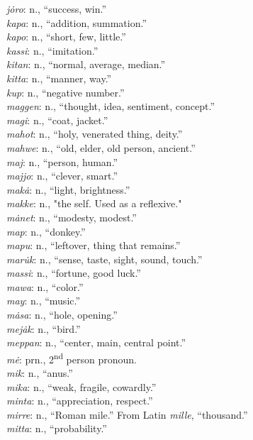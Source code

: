 \documentclass{article}[10pt]
\begin{document}
\begin{multicols}{3}
\emph{j\.{o}ro}: n., ``success, win.''\\
\emph{kapa}: n., ``addition, summation.''\\
\emph{kapo}: n., ``short, few, little.''\\
\emph{kassi}: n., ``imitation.''\\
\emph{kitan}: n., ``normal, average, median.''\\
\emph{kitta}: n., ``manner, way.''\\
\emph{kup}: n., ``negative number.''\\
\emph{maggen}: n., ``thought, idea, sentiment, concept.''\\
\emph{magi}: n., ``coat, jacket.''\\
\emph{mahot}: n., ``holy, venerated thing, deity.''\\
\emph{mahwe}: n., ``old, elder, old person, ancient.''\\
\emph{maj}: n., ``person, human.''\\
\emph{majjo}: n., ``clever, smart.''\\
\emph{mak\.{a}}: n., ``light, brightness.''\\
\emph{makke}: n., "the self. Used as a reflexive."\\
\emph{m\.{a}net}: n., ``modesty, modest.''\\
\emph{map}: n., ``donkey.''\\
\emph{mapu}: n., ``leftover, thing that remains.''\\
\emph{mar\.{u}k}: n., ``sense, taste, sight, sound, touch.''\\
\emph{massi}: n., ``fortune, good luck.''\\
\emph{mawa}: n., ``color.''\\
\emph{may}: n., ``music.''\\
\emph{m\.{a}sa}: n., ``hole, opening.''\\
\emph{mej\.{a}k}: n., ``bird.''\\
\emph{meppan}: n., ``center, main, central point.''\\
\emph{m\.{e}}: prn., 2\textsuperscript{nd} person pronoun.\\
\emph{mik}: n., ``anus.''\\
\emph{mika}: n., ``weak, fragile, cowardly.''\\
\emph{minta}: n., ``appreciation, respect.''\\
\emph{mirre}: n., ``Roman mile.'' From Latin \emph{mille}, ``thousand.''\\
\emph{mitta}: n., ``probability.''\\

\end{multicols}
\end{document}
